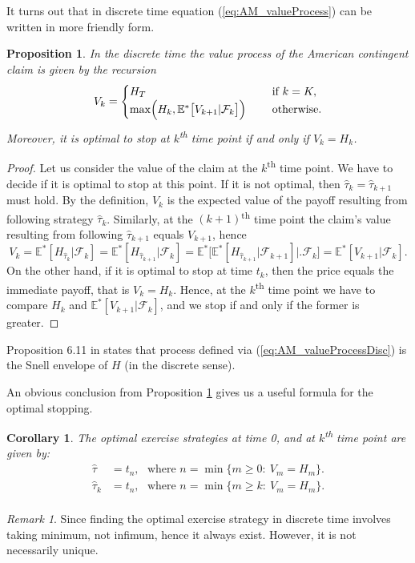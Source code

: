 \documentclass[a4paper,11pt, twoside]{book}
\newtheorem{prop}[thm]{Proposition}
\newtheorem{coro}[thm]{Corollary}
\theoremstyle{definition}
\theoremstyle{remark}
\newtheorem{remark}{Remark}[chapter]
\def\Em{{\mathbb{E}^*}}
\begin{document}
It turns out that in discrete time equation (\ref{eq:AM_valueProcess}) can be written in more friendly form.
\begin{prop}
\label{prop:AM_valueProcessDisc}
 In the discrete time the value process of the American contingent claim is given by the recursion
 \begin{equation}
  \label{eq:AM_valueProcessDisc}
  V_{k} = \begin{cases}
             H_T &\text{if } k = K,\\
             \max\Bigl(H_{k}, \Em\bigl[ V_{k+1} | \mathcal{F}_{k} \bigr] \Bigl)\ \ \ \ &\text{otherwise.}
            \end{cases}
 \end{equation}
 Moreover, it is optimal to stop at $k$\textsuperscript{th} time point if and only if $V_{k} = H_{k}$. 
\end{prop}
\begin{proof}
Let us consider the value of the claim at the $k$\textsuperscript{th} time point.  We have to decide if it is optimal to stop at this point. If it is not optimal, then $\hat{\tau}_{k} = \hat{\tau}_{k+1}$ must hold. By the definition, $V_{k}$ is the expected value of the payoff resulting from following strategy $\hat{\tau}_{k}$. Similarly, at the $(k+1)$\textsuperscript{th} time point the claim's value resulting from following $\hat{\tau}_{k+1}$ equals $V_{k+1}$, hence
\[ V_{k} = \Em[H_{\hat{\tau}_{k}} | \mathcal{F}_{k}] = \Em[H_{\hat{\tau}_{k+1}} | \mathcal{F}_{k}] = \Em\bigl[\Em[H_{\hat{\tau}_{k+1}} | \mathcal{F}_{k+1}] \bigl|\bigr. \mathcal{F}_{k} \bigr] = \Em[V_{k+1} | \mathcal{F}_{k}].\]
On the other hand, if it is optimal to stop at time $t_k$, then the price equals the immediate payoff, that is $V_{k} = H_{k}$. Hence, at the $k$\textsuperscript{th} time point we have to compare $H_{k}$ and $\Em[V_{k+1} | \mathcal{F}_{k}]$, and we stop if and only if the former is greater.
\end{proof}
Proposition 6.11 in \cite{follmer} states that process defined via (\ref{eq:AM_valueProcessDisc}) is the Snell envelope of $H$ (in the discrete sense).

An obvious conclusion from Proposition \ref{prop:AM_valueProcessDisc} gives us a useful formula for the optimal stopping.
\begin{coro}
 \label{coro:AM_optStopDisc}
 The optimal exercise strategies at time 0, and at $k$\textsuperscript{th} time point are given by:
 \begin{equation}
  \label{eq:AM_optStopDisc}
  \begin{split}
   \hat{\tau} &= t_n,\ \ \ \text{where } n = \min\{m \geq 0:\ V_m = H_m \}.\\
   \hat{\tau}_{k} &= t_n,\ \ \ \text{where } n = \min\{m \geq k:\ V_m = H_m \}.\\
  \end{split}
 \end{equation}
\end{coro}
\begin{remark}
 Since finding the optimal exercise strategy in discrete time involves taking minimum, not infimum, hence it always exist. However, it is not necessarily unique.
\end{remark}
\end{document}
